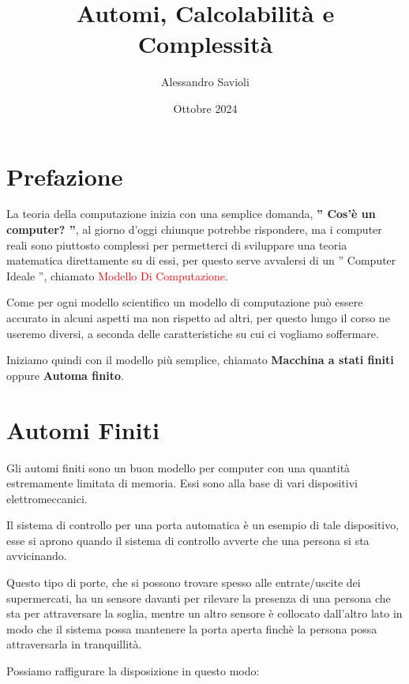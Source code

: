 \documentclass{article}
\begin{document}
\title{Automi, Calcolabilità e Complessità}
\author{Alessandro Savioli}
\date{Ottobre 2024}

\maketitle

\tableofcontents

\newpage

\section{Prefazione}

La teoria della computazione inizia con una semplice domanda, \textbf{'' Cos'è
un computer? ''}, al giorno d'oggi chiunque potrebbe rispondere, ma i computer
reali sono piuttosto complessi per permetterci di sviluppare una teoria
matematica direttamente su di essi, per questo serve avvalersi di un '' Computer
Ideale '', chiamato \textcolor{red}{Modello Di Computazione}.

Come per ogni modello scientifico un modello di computazione può essere accurato
in alcuni aspetti ma non rispetto ad altri, per questo lungo il corso ne useremo
diversi, a seconda delle caratteristiche su cui ci vogliamo soffermare.

Iniziamo quindi con il modello più semplice, chiamato \textbf{Macchina a stati
finiti} oppure \textbf{Automa finito}.

\section{Automi Finiti}
Gli automi finiti sono un buon modello per computer con una quantità
estremamente limitata di memoria. Essi sono alla base di vari dispositivi
elettromeccanici. 

Il sistema di controllo per una porta automatica è un esempio di tale
dispositivo, esse si aprono quando il sistema di controllo avverte che una
persona si sta avvicinando. 

Questo tipo di porte, che si possono trovare spesso alle entrate/uscite dei
supermercati, ha un sensore davanti per rilevare la presenza di una persona che
sta per attraversare la soglia, mentre un altro sensore è collocato dall'altro
lato in modo che il sistema possa mantenere la porta aperta finchè la persona
possa attraversarla in tranquillità. 

Possiamo raffigurare la disposizione in questo modo: 
\end{document}
